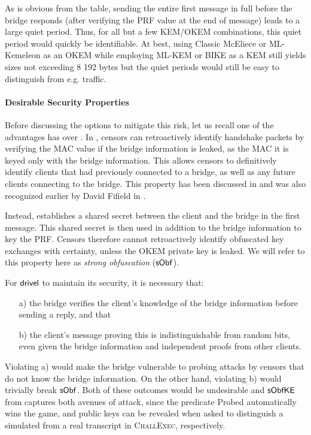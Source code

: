 As is obvious from the table, sending the entire first \drivel{} message in full before the bridge responds (after verifying the PRF value at the end of message) leads to a large quiet period. Thus, for all but a few KEM/OKEM combinations, this quiet period would quickly be identifiable. At best, using Classic McEliece or ML-Kemeleon as an OKEM while employing ML-KEM or BIKE as a KEM still yields sizes not exceeding 8 192 bytes but the quiet periods would still be easy to distinguish from e.g. \obfsfour{} traffic.

\paragraph{Desirable Security Properties}
Before discussing the options to mitigate this risk, let us recall one of the advantages \drivel{} has over \obfsfour{}. In \obfsfour{}, censors can retroactively identify handshake packets by verifying the MAC value if the bridge information is leaked, as the MAC it is keyed only with the bridge information. This allows censors to definitively identify clients that had previously connected to a bridge, as well as any future clients connecting to the bridge. This property has been discussed in \cite[Section~6]{CCS:GunSteVei24} and was also recognized earlier by David Fifield in \cite{obfs4-pk-reveal-distinguisher}.

Instead, \drivel{} establishes a shared secret between the client and the bridge in the first message. This shared secret is then used in addition to the bridge information to key the PRF. Censors therefore cannot retroactively identify obfuscated key exchanges with certainty, unless the OKEM private key is leaked. We will refer to this property here as \emph{strong obfuscation} ($\mathsf{sObf}$).

For $\textsf{drivel}$ to maintain its security, it is necessary that:
\begin{itemize}
    \item[a)] the bridge verifies the client's knowledge of the bridge information before sending a reply, and that
    \item[b)] the client's message proving this is indistinguishable from random bits, even given the bridge information and independent proofs from other clients.
\end{itemize}

Violating a) would make the bridge vulnerable to probing attacks by censors that do not know the bridge information. On the other hand, violating b) would trivially break $\mathsf{sObf}$. Both of these outcomes would be undesirable and $\mathsf{sObfKE}$ from \cite{CCS:GunSteVei24} captures both avenues of attack, since the predicate \textsf{Probed} automatically wins the game, and public keys can be revealed when asked to distinguish a simulated from a real transcript in \textsc{ChallExec}, respectively.

